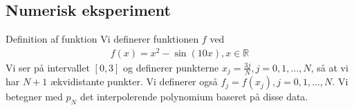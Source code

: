 \subsection{Numerisk eksperiment}
\begin{frame}{Definition af funktion}
    Vi definerer funktionen $f$ ved
    \begin{align*}
    f(x)=x^2-\sin(10x), x \in \mathbb{R}
    \end{align*}
    Vi ser på intervallet $\left [0,3 \right ]$ og definerer punkterne $x_j = \frac{3j}{N}, j = 0, 1, \ldots, N$, så at vi har $N+1$ ækvidistante punkter. Vi definerer også $f_j=f(x_j), j=0,1,\ldots,N.$ Vi betegner med $p_N$ det interpolerende polynomium baseret på disse data.  
\end{frame}